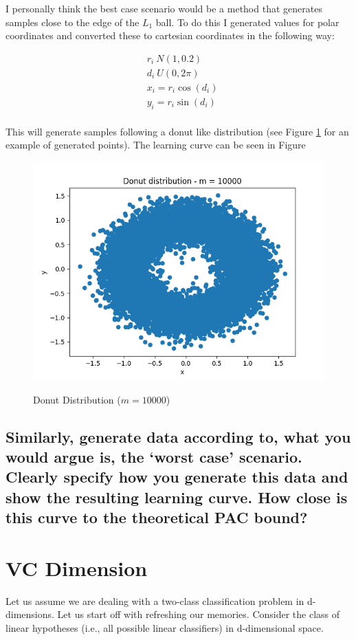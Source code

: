 \documentclass[11pt,a4paper]{article}
\begin{document}
I personally think the best case scenario would be a method that generates samples close to the edge of the $L_1$ ball. To do this I generated values for polar coordinates and converted these to cartesian coordinates in the following way:

\begin{align*} 
    &r_i ~ N(1, 0.2) \\ 
    &d_i ~ U(0, 2\pi) \\
    &x_i = r_i \cos(d_i) \\
    &y_i = r_i \sin(d_i) \\
\end{align*}

This will generate samples following a donut like distribution (see Figure \ref{fig:donut} for an example of generated points). The learning curve can be seen in Figure 

\begin{figure}[h]
    \caption{Donut Distribution ($m=10000$)}
    \centering
    \includegraphics[width=\textwidth]{donut.png}
    \label{fig:donut}
\end{figure}

\subsection{Similarly, generate data according to, what you would argue is, the ‘worst case’ scenario.
Clearly specify how you generate this data and show the resulting learning curve. How
close is this curve to the theoretical PAC bound?}


\clearpage
\section{VC Dimension}
\label{sec:VC}
Let us assume we are dealing with a two-class classification problem in d-dimensions.
Let us start off with refreshing our memories. Consider the class of linear hypotheses (i.e.,
all possible linear classifiers) in d-dimensional space.
\end{document}
